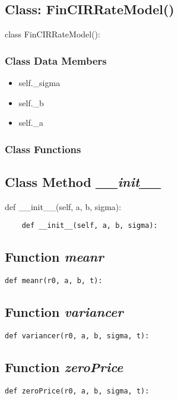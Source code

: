 \documentclass[twoside,11pt]{book}
\begin{document}
\subsection{Class: FinCIRRateModel()}
class FinCIRRateModel():

\subsubsection{Class Data Members}
\begin{itemize}
\item{self.\_sigma}
\item{self.\_b}
\item{self.\_a}
\end{itemize}

\subsubsection{Class Functions}

\subsection{Class Method {\it \_\_init\_\_}}
def \_\_init\_\_(self, a, b, sigma):

\begin{lstlisting}
    def __init__(self, a, b, sigma):
\end{lstlisting}

\subsection{Function {\it meanr}}


\begin{lstlisting}
def meanr(r0, a, b, t):
\end{lstlisting}

\subsection{Function {\it variancer}}


\begin{lstlisting}
def variancer(r0, a, b, sigma, t):
\end{lstlisting}

\subsection{Function {\it zeroPrice}}


\begin{lstlisting}
def zeroPrice(r0, a, b, sigma, t):
\end{lstlisting}
\end{document}
